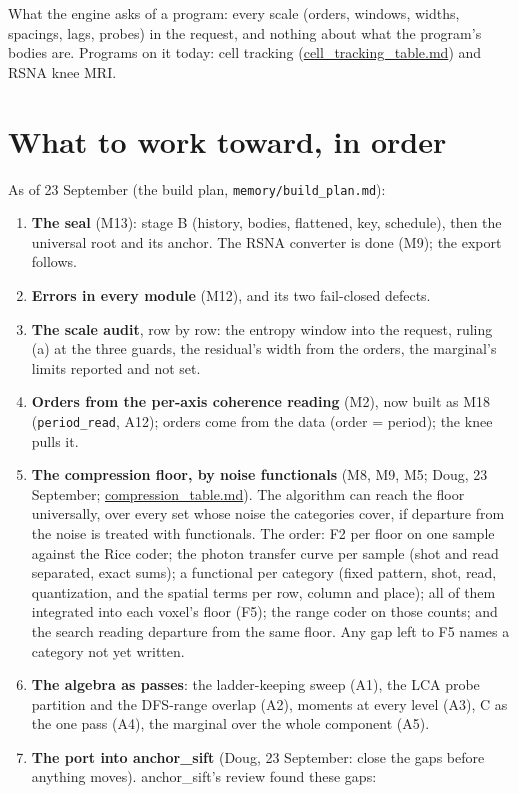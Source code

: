 What the engine asks of a program: every scale (orders, windows, widths, spacings, lags, probes) in the request, and nothing about what the program's bodies are. Programs on it today: cell tracking (\hyperref[chap:cell-tracking-table]{cell\_\allowbreak{}tracking\_\allowbreak{}table.md}) and RSNA knee MRI.

\section{\texorpdfstring{What to work toward, in order}{What to work toward, in order}}

As of 23 September (the build plan, \texttt{memory/\allowbreak{}build\_\allowbreak{}plan.\allowbreak{}md}):

\begin{enumerate}
\item \textbf{The seal} (M13): stage B (history, bodies, flattened, key, schedule), then the universal root and its anchor. The RSNA converter is done (M9); the export follows.
\item \textbf{Errors in every module} (M12), and its two fail-closed defects.
\item \textbf{The scale audit}, row by row: the entropy window into the request, ruling (a) at the three guards, the residual's width from the orders, the marginal's limits reported and not set.
\item \textbf{Orders from the per-axis coherence reading} (M2), now built as M18 (\texttt{period\_\allowbreak{}read}, A12); orders come from the data (order = period); the knee pulls it.
\item \textbf{The compression floor, by noise functionals} (M8, M9, M5; Doug, 23 September; \hyperref[chap:compression-table]{compression\_\allowbreak{}table.md}). The algorithm can reach the floor universally, over every set whose noise the categories cover, if departure from the noise is treated with functionals. The order: F2 per floor on one sample against the Rice coder; the photon transfer curve per sample (shot and read separated, exact sums); a functional per category (fixed pattern, shot, read, quantization, and the spatial terms per row, column and place); all of them integrated into each voxel's floor (F5); the range coder on those counts; and the search reading departure from the same floor. Any gap left to F5 names a category not yet written.
\item \textbf{The algebra as passes}: the ladder-keeping sweep (A1), the LCA probe partition and the DFS-range overlap (A2), moments at every level (A3), C as the one pass (A4), the marginal over the whole component (A5).
\item \textbf{The port into anchor\_\allowbreak{}sift} (Doug, 23 September: close the gaps before anything moves). anchor\_\allowbreak{}sift's review found these gaps:


\end{enumerate}
